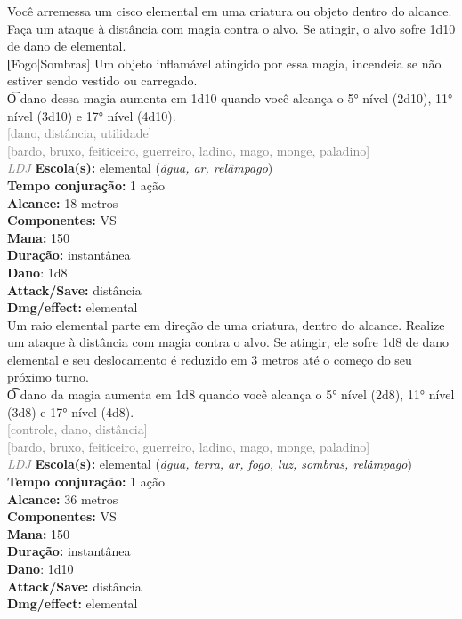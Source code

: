 \documentclass{RPG_Adventure}[2021/10/20]
\begin{document}
{\normalsize Você arremessa um cisco elemental em uma criatura ou objeto dentro do alcance. Faça um ataque à distância com magia contra o alvo. Se atingir, o alvo sofre 1d10 de dano de elemental.\\\t [Fogo|Sombras] Um objeto inflamável atingido por essa magia, incendeia se não estiver sendo vestido ou carregado.\\\t O dano dessa magia aumenta em 1d10 quando você alcança o 5° nível (2d10), 11° nível (3d10) e 17° nível (4d10).\\}
{\scriptsize \textcolor{gray}{[dano, distância, utilidade]\\}}
{\scriptsize \textcolor{gray}{[bardo, bruxo, feiticeiro, guerreiro, ladino, mago, monge, paladino]\\}}
{\tiny \textcolor{gray}{\textit{LDJ}}}
{\small \t \textbf{Escola(s):} elemental (\textit{água, ar, relâmpago})\\\t \textbf{Tempo conjuração:} 1 ação\\\t \textbf{Alcance:} 18 metros\\\t \textbf{Componentes:} VS\\\t \textbf{Mana:} 150\\\t \textbf{Duração:} instantânea\\\t \textbf{Dano}: 1d8\\\t \textbf{Attack/Save:} distância\\\t \textbf{Dmg/effect:} elemental\\}
{\normalsize Um raio elemental parte em direção de uma criatura, dentro do alcance. Realize um ataque à distância com magia contra o alvo. Se atingir, ele sofre 1d8 de dano elemental e seu deslocamento é reduzido em 3 metros até o começo do seu próximo turno.\\\t O dano da magia aumenta em 1d8 quando você alcança o 5° nível (2d8), 11° nível (3d8) e 17° nível (4d8).\\}
{\scriptsize \textcolor{gray}{[controle, dano, distância]\\}}
{\scriptsize \textcolor{gray}{[bardo, bruxo, feiticeiro, guerreiro, ladino, mago, monge, paladino]\\}}
{\tiny \textcolor{gray}{\textit{LDJ}}}
{\small \t \textbf{Escola(s):} elemental (\textit{água, terra, ar, fogo, luz, sombras, relâmpago})\\\t \textbf{Tempo conjuração:} 1 ação\\\t \textbf{Alcance:} 36 metros\\\t \textbf{Componentes:} VS\\\t \textbf{Mana:} 150\\\t \textbf{Duração:} instantânea\\\t \textbf{Dano}: 1d10\\\t \textbf{Attack/Save:} distância\\\t \textbf{Dmg/effect:} elemental\\}
\end{document}
